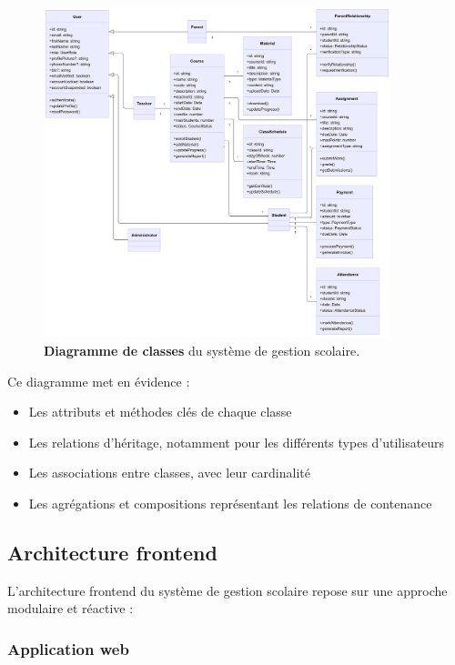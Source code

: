 \begin{figure}[H]
  \centering
  \includegraphics[width=0.9\textwidth,keepaspectratio]{pfe-pics/diagrames/class.png}
  \caption{\textbf{Diagramme de classes} du système de gestion scolaire.}
  \label{fig:school_class_diagram}
\end{figure}

Ce diagramme met en évidence :

\begin{itemize}
  \item Les attributs et méthodes clés de chaque classe
  
  \item Les relations d'héritage, notamment pour les différents types d'utilisateurs
  
  \item Les associations entre classes, avec leur cardinalité
  
  \item Les agrégations et compositions représentant les relations de contenance
\end{itemize}

\subsection{Architecture frontend}

L'architecture frontend du système de gestion scolaire repose sur une approche modulaire et réactive :

\subsubsection{Application web}

